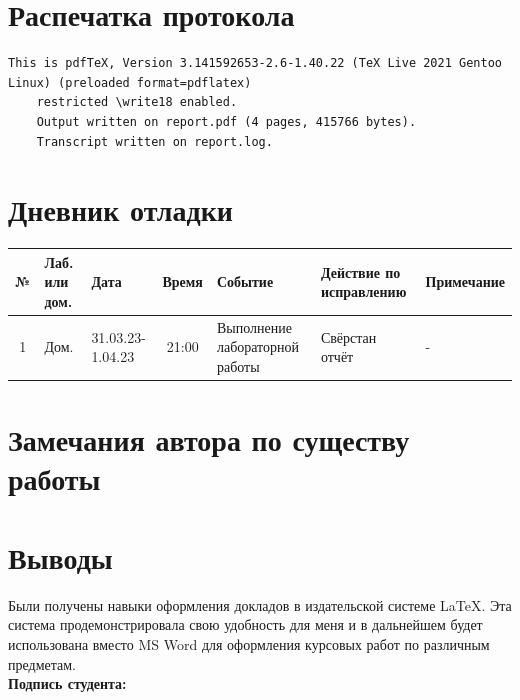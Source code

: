 \documentclass[12pt, letterpaper]{article}
\begin{document}
\section{Распечатка протокола}
\begin{lstlisting}[breaklines]
    This is pdfTeX, Version 3.141592653-2.6-1.40.22 (TeX Live 2021 Gentoo Linux) (preloaded format=pdflatex)
    restricted \write18 enabled.
    Output written on report.pdf (4 pages, 415766 bytes).
    Transcript written on report.log.
\end{lstlisting}  
\section{Дневник отладки}
\begin{tabular}{|c|p{1cm}|p{1.5cm}|c|p{2.5cm}|p{2cm}|p{2.25cm}|}
    \hline
    № & Лаб. или дом. & Дата & Время & Событие & Действие по исправлению & Примечание\\
    \hline
    1 & Дом. & 31.03.23-1.04.23 & 21:00 & Выполнение лабораторной работы & Свёрстан отчёт & -\\
    \hline
\end{tabular}
\section{Замечания автора по существу работы}
\section{Выводы}
\enlargethispage{-1\baselineskip}
Были получены навыки оформления докладов в издательской системе \LaTeX{}. Эта система продемонстрировала свою удобность для меня и в дальнейшем будет использована вместо MS Word для оформления курсовых работ по различным предметам. \\
\flushright \textbf{Подпись студента:} \underline{\hspace{3cm}}
\end{document}

